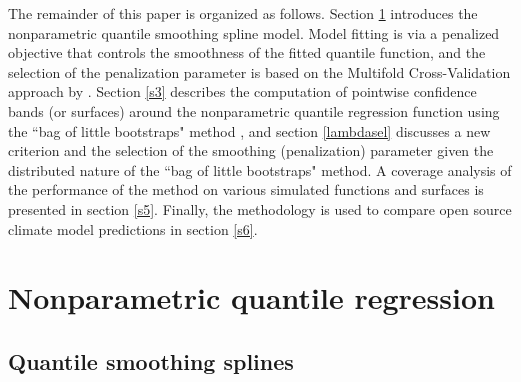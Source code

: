 \documentclass{statsoc}
\begin{document}
The remainder of this paper is organized as follows. Section \ref{s2} introduces the nonparametric quantile smoothing spline model. Model fitting is via a penalized objective that controls the smoothness of the fitted  quantile function, and the selection of the penalization parameter is based on the Multifold Cross-Validation approach by \citet{reiss2012smoothness}. Section \ref{s3} describes the computation of pointwise confidence bands (or surfaces) around the nonparametric quantile regression function using the ``bag of little bootstraps" method \citep{kleiner2014scalable}, and section \ref{lambdasel} discusses a new criterion and the selection of the smoothing (penalization) parameter given the distributed nature of the ``bag of little bootstraps" method. A coverage analysis of the performance of the method on various simulated functions and surfaces is presented in section \ref{s5}. Finally, the methodology is used to compare open source climate model predictions in section \ref{s6}.

\section{Nonparametric quantile regression}\label{s2}
\subsection{Quantile smoothing splines}\label{s21}
\end{document}
